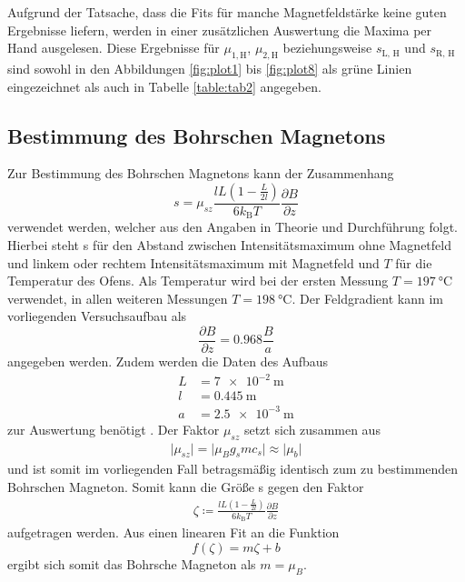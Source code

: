 Aufgrund der Tatsache, dass die Fits für manche Magnetfeldstärke keine guten Ergebnisse liefern, werden in einer zusätzlichen Auswertung die Maxima per Hand ausgelesen.
Diese Ergebnisse für $\mu_{1, \text{H}}$, $\mu_{2, \text{H}}$ beziehungsweise $s_\text{L, H}$ und $s_\text{R, H}$ sind sowohl in den Abbildungen \ref{fig:plot1} bis \ref{fig:plot8} als grüne Linien eingezeichnet als auch in Tabelle \ref{table:tab2} angegeben.


\subsection{Bestimmung des Bohrschen Magnetons}

Zur Bestimmung des Bohrschen Magnetons kann der Zusammenhang
\begin{equation}
  s = \mu_{sz} \frac{l L \left( 1 - \frac{L}{2l} \right)}{6 k_\text{B} T} \frac{\partial B}{\partial z}
\end{equation}
verwendet werden, welcher aus den Angaben in Theorie und Durchführung folgt.
Hierbei steht s für den Abstand zwischen Intensitätsmaximum ohne Magnetfeld und linkem oder rechtem Intensitätsmaximum mit Magnetfeld und $T$ für die Temperatur des Ofens.
Als Temperatur wird bei der ersten Messung $T = \SI{197}{\celsius}$ verwendet, in allen weiteren Messungen $T = \SI{198}{\celsius}$.
Der Feldgradient kann im vorliegenden Versuchsaufbau als
\begin{equation}
  \frac{\partial B}{\partial z} = \num{0.968} \frac{B}{a}
\end{equation}
angegeben werden.
Zudem werden die Daten des Aufbaus
\begin{align*}
  L &= \SI{7e-2}{\metre}\\
  l &= \SI{0.445}{\metre}\\
  a &= \SI{2.5e-3}{\metre}
\end{align*}
zur Auswertung benötigt \cite{skript}.
Der Faktor $\mu_{sz}$ setzt sich zusammen aus
\begin{align*}
  \lvert \mu_{sz} \rvert = \lvert \mu_B g_s mc_s \rvert \approx \lvert \mu_b \rvert
\end{align*}
und ist somit im vorliegenden Fall betragsmäßig identisch zum zu bestimmenden Bohrschen Magneton.
Somit kann die Größe s gegen den Faktor
\begin{align*}
  \zeta \coloneq \frac{l L \left( 1 - \frac{L}{2l} \right)}{6 k_\text{B} T} \frac{\partial B}{\partial z}
\end{align*}
aufgetragen werden.
Aus einen linearen Fit an die Funktion
\begin{equation}
  f(\zeta) = m \zeta + b
\end{equation}
ergibt sich somit das Bohrsche Magneton als $m = \mu_B$.

